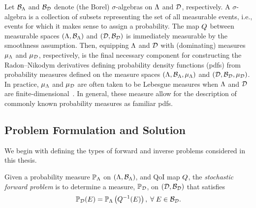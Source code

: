 Let $\mathcal{B}_{{\Lambda}}$ and $\mathcal{B}_{\mathcal{D}}$ denote (the Borel) $\sigma$-algebras on ${\Lambda}$ and $\mathcal{D}$, respectively.
A $\sigma$-algebra is a collection of subsets representing the set of all measurable events, i.e., events for which it makes sense to assign a probability.
The map $Q$ between measurable spaces $({\Lambda}, \mathcal{B}_{{\Lambda}})$ and $(\mathcal{D}, \mathcal{B}_{\mathcal{D}})$ is immediately measurable by the smoothness assumption.
Then, equipping ${\Lambda}$ and $\mathcal{D}$ with (dominating) measures $\mu_{{\Lambda}}$ and $\mu_{\mathcal{D}}$, respectively, is the final necessary component for constructing the Radon--Nikodym derivatives defining probability density functions (pdfs) from probability measures defined on the measure spaces $({\Lambda}, \mathcal{B}_{{\Lambda}}, \mu_{{\Lambda}})$ and $(\mathcal{D}, \mathcal{B}_{\mathcal{D}}, \mu_{\mathcal{D}})$.
In practice, $\mu_{{\Lambda}}$ and $\mu_{\mathcal{D}}$ are often taken to be Lebesgue measures when ${\Lambda}$ and $\mathcal{D}$ are finite-dimensional~\cite{BET+14, BJW18a}.
In general, these measure allow for the description of commonly known probability measures as familiar pdfs.

\subsection{Problem Formulation and Solution}
We begin with defining the types of forward and inverse problems considered in this thesis.

\begin{defn}\label{defn:forward-problem}
  Given a probability measure $\mathbb{P}_{\Lambda}$ on $({\Lambda}, \mathcal{B}_{{\Lambda}})$, and QoI map $Q$, the \emph{stochastic forward problem} is to determine a measure, $\mathbb{P}_{\mathcal{D}}$, on $(\mathcal{D}, \mathcal{B}_{\mathcal{D}})$ that satisfies
  \begin{equation}\label{eq:forward-problem}
    \mathbb{P}_{\mathcal{D}} (E) = \mathbb{P}_{\Lambda} \left ( Q^{-1}(E) \right ), \; \forall \; E \in \mathcal{B}_{\mathcal{D}}.
  \end{equation}
\end{defn}

